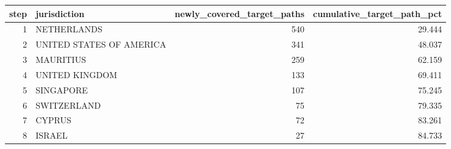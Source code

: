 \begin{tabular}{rlrr}
\toprule
step & jurisdiction & newly\_covered\_target\_paths & cumulative\_target\_path\_pct \\
\midrule
1 & NETHERLANDS & 540 & 29.444 \\
2 & UNITED STATES OF AMERICA & 341 & 48.037 \\
3 & MAURITIUS & 259 & 62.159 \\
4 & UNITED KINGDOM & 133 & 69.411 \\
5 & SINGAPORE & 107 & 75.245 \\
6 & SWITZERLAND & 75 & 79.335 \\
7 & CYPRUS & 72 & 83.261 \\
8 & ISRAEL & 27 & 84.733 \\
\bottomrule
\end{tabular}
